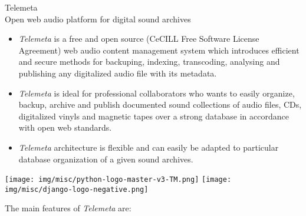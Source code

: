 \documentclass[final, hyperref, table]{beamer}
\begin{document}
\begin{frame}[containsverbatim]{}
\begin{columns}[T]
\begin{column}[T]{.49\linewidth}
 

      \begin{block}{{\Large Telemeta}\\Open web audio platform for digital sound archives}
        \begin{center}
\end{center}

        \begin{itemize}
        \item \emph{Telemeta} is a free and open source ({\scriptsize CeCILL
            Free Software License Agreement}) web audio content management
          system which introduces efficient and secure methods for
          \alert{backuping}, \alert{indexing}, \alert{transcoding}, \alert{analysing} and \alert{publishing} any
          digitalized audio file with its metadata.
        \item \emph{Telemeta} is ideal for
          professional collaborators who wants to easily organize, backup, archive and
          publish documented sound collections of audio files, CDs,
          digitalized vinyls and magnetic tapes over a strong database in
          accordance with \alert{open web standards}.
        \item \emph{Telemeta} architecture
          is \alert{flexible} and can easily be adapted to particular database
          organization of a given sound archives.
        \end{itemize}
        \begin{center}
          \texttt{[image: img/misc/python-logo-master-v3-TM.png]}\hspace{3cm}
          \texttt{[image: img/misc/django-logo-negative.png]}
        \end{center}

        The main features of \emph{Telemeta} are:
\vspace{-0.5cm}
\begin{multicols}{2}[]
        

\end{multicols}
\end{block}
\end{column}
\end{columns}
\end{frame}
\end{document}
